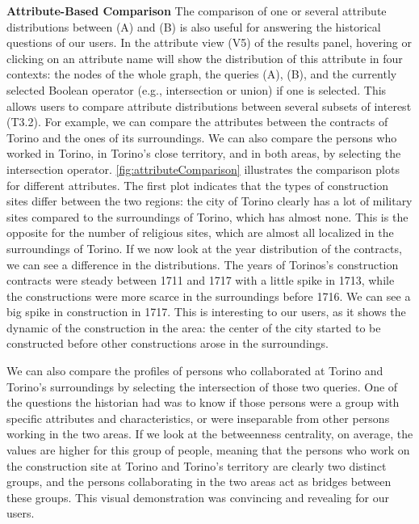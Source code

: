\noindent\textbf{Attribute-Based Comparison}
The comparison of one or several attribute distributions between (A) and (B) is also useful for answering the historical questions of our users.
In the attribute view (V5) of the results panel, hovering or clicking on an attribute name will show the distribution of this attribute in four contexts: the nodes of the whole graph, the queries (A), (B), and the currently selected Boolean operator (e.g., intersection or union) if one is selected.
This allows users to compare attribute distributions between several subsets of interest (T3.2).
For example, we can compare the attributes between the contracts of Torino and the ones of its surroundings.
We can also compare the persons who worked in Torino, in Torino's close territory, and in both areas, by selecting the intersection operator.
\autoref{fig:attributeComparison} illustrates the comparison plots for different attributes.
The first plot indicates that the types of construction sites differ between the two regions: the city of Torino clearly has a lot of military sites compared to the surroundings of Torino, which has almost none.
This is the opposite for the number of religious sites, which are almost all localized in the surroundings of Torino.
If we now look at the year distribution of the contracts, we can see a difference in the distributions.
The years of Torinos's construction contracts were steady between 1711 and 1717 with a little spike in 1713, while the constructions were more scarce in the surroundings before 1716.
We can see a big spike in construction in 1717.
This is interesting to our users, as it shows the dynamic of the construction in the area: the center of the city started to be constructed before other constructions arose in the surroundings.

We can also compare the profiles of persons who collaborated at Torino and Torino's surroundings by selecting the intersection of those two queries.
One of the questions the historian had was to know if those persons were a group with specific attributes and characteristics, or were inseparable from other persons working in the two areas.
If we look at the betweenness centrality, on average, the values are higher for this group of people, meaning that the persons who work on the construction site at Torino and Torino's territory are clearly two distinct groups, and the persons collaborating in the two areas act as bridges between these groups.
This visual demonstration was convincing and revealing for our users.

